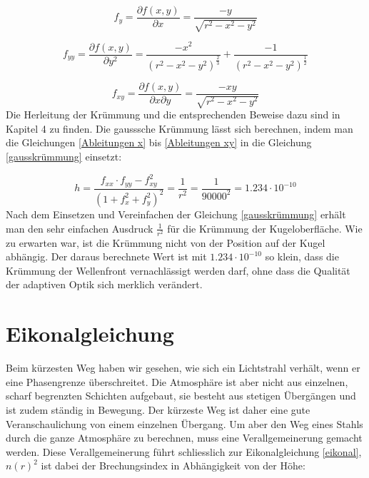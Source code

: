 \begin{refsection}
\begin{equation}\label{Ableitungen y}
f_{y} =\dfrac{\partial f(x,y)}{\partial x}= \dfrac{-y}{\sqrt{r^{2}-x^{2}-y^{2}}}
\end{equation}

\begin{equation}\label{Ableitungen yy}
f_{yy}=\dfrac{\partial f(x,y)}{\partial y^{2}}= \dfrac{- x^2}{(r^2 - x^2 - y^2)^{\frac{2}{3}}}+\dfrac{ - 1}{(r^2 - x^2 - y^2)^{\frac{1}{2}}}
\end{equation}

\begin{equation}\label{Ableitungen xy}
f_{xy}=\dfrac{\partial f(x,y)}{\partial x \partial y}=  \dfrac{-xy}{\sqrt{r^{2}-x^{2}-y^{2}}}
\end{equation}
Die Herleitung der Krümmung und die entsprechenden Beweise dazu sind in Kapitel 4 zu finden. Die gausssche Krümmung lässt sich berechnen, indem man die Gleichungen \eqref{Ableitungen x} bis \eqref{Ableitungen xy} in die Gleichung \eqref{gausskrümmung} einsetzt:  

\begin{equation}\label{gausskrümmung}
h = \dfrac{f_{xx} \cdot f_{yy} -f_{xy}^{2}}{(1+f_{x}^{2}+f_{y}^{2})^{2}} = \dfrac{1}{r^{2}} =\dfrac{1}{90000^{2}} = 1.234\cdot 10^{-10}
\end{equation}
Nach dem Einsetzen und Vereinfachen der Gleichung \eqref{gausskrümmung} erhält man den sehr einfachen Ausdruck $\frac{1}{r^{2}}$ für die Krümmung der Kugeloberfläche. Wie zu erwarten war, ist die Krümmung nicht von der Position auf der Kugel abhängig. 
Der daraus berechnete Wert ist mit $1.234\cdot 10^{-10}$ so klein, dass die Krümmung der Wellenfront vernachlässigt werden darf, ohne dass die Qualität der adaptiven Optik sich merklich verändert.

\section{Eikonalgleichung}
Beim kürzesten Weg haben wir gesehen, wie sich ein Lichtstrahl verhält, wenn er eine Phasengrenze überschreitet. Die Atmosphäre ist aber nicht aus einzelnen, scharf begrenzten Schichten aufgebaut, sie besteht aus stetigen Übergängen und ist zudem ständig in Bewegung. Der kürzeste Weg ist daher eine gute Veranschaulichung von einem einzelnen Übergang. Um aber den Weg eines Stahls durch die ganze Atmosphäre zu berechnen, muss eine Verallgemeinerung gemacht werden. Diese Verallgemeinerung führt schliesslich zur Eikonalgleichung \eqref{eikonal}, $n(r)^{2}$ ist dabei der Brechungsindex in Abhängigkeit von der Höhe: 


\end{refsection}
